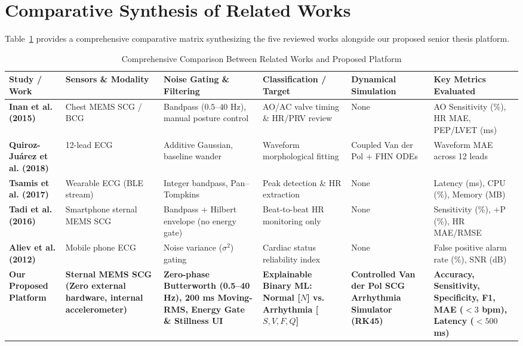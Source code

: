 \newpage
\section{Comparative Synthesis of Related Works}

Table~\ref{tab:literature_comparison} provides a comprehensive comparative matrix synthesizing the five reviewed works alongside our proposed senior thesis platform.

\begin{table}[!ht]
\footnotesize
\sloppy
\centering
\caption{Comprehensive Comparison Between Related Works and Proposed Platform}
\label{tab:literature_comparison}
\begin{tabular}{|p{2.3cm}|p{2.1cm}|p{2.1cm}|p{2.2cm}|p{2.1cm}|p{2.2cm}|}
\hline
\textbf{Study / Work} & \textbf{Sensors \& Modality} & \textbf{Noise Gating \& Filtering} & \textbf{Classification / Target} & \textbf{Dynamical Simulation} & \textbf{Key Metrics Evaluated} \\ \hline
\textbf{Inan et al. (2015) \cite{inan2015ballistocardiography}} & Chest MEMS SCG / BCG & Bandpass ($0.5\text{--}40\text{ Hz}$), manual posture control & AO/AC valve timing \& HR/PRV review & None & AO Sensitivity (\%), HR MAE, PEP/LVET (ms) \\ \hline
\textbf{Quiroz-Ju{\'a}rez et al. (2018) \cite{quiroz2018cardiac}} & 12-lead ECG & Additive Gaussian, baseline wander & Waveform morphological fitting & Coupled Van der Pol + FHN ODEs & Waveform MAE across 12 leads \\ \hline
\textbf{Tsamis et al. (2017) \cite{tsamis2017soft}} & Wearable ECG (BLE stream) & Integer bandpass, Pan--Tompkins & Peak detection \& HR extraction & None & Latency (ms), CPU (\%), Memory (MB) \\ \hline
\textbf{Tadi et al. (2016) \cite{tadi2016realtime}} & Smartphone sternal MEMS SCG & Bandpass + Hilbert envelope (no energy gate) & Beat-to-beat HR monitoring only & None & Sensitivity (\%), $+$P (\%), HR MAE/RMSE \\ \hline
\textbf{Aliev et al. (2012) \cite{aliev2012monitoring}} & Mobile phone ECG & Noise variance ($\sigma^2$) gating & Cardiac status reliability index & None & False positive alarm rate (\%), SNR (dB) \\ \hline
\textbf{Our Proposed Platform} & \textbf{Sternal MEMS SCG (Zero external hardware, internal accelerometer)} & \textbf{Zero-phase Butterworth (0.5--40 Hz), 200 ms Moving-RMS, Energy Gate \& Stillness UI} & \textbf{Explainable Binary ML: Normal [$N$] vs. Arrhythmia [$S, V, F, Q$]} & \textbf{Controlled Van der Pol SCG Arrhythmia Simulator (RK45)} & \textbf{Accuracy, Sensitivity, Specificity, F1, MAE ($<3$ bpm), Latency ($<500$ ms)} \\ \hline
\end{tabular}
\end{table}

